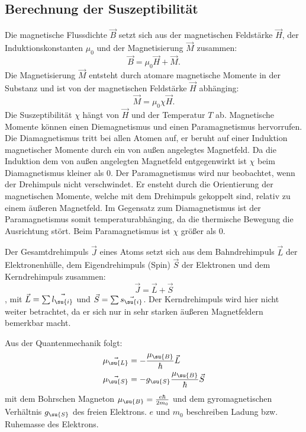 \subsection{Berechnung der Suszeptibilität}
Die magnetische Flussdichte $\vec{B}$ setzt sich aus der magnetischen Feldstärke
$\vec{H}$, der Induktionskonstanten $\mu_0$ und der Magnetisierung $\vec{M}$
zusammen:
\begin{equation}
  \vec{B} = \mu_0 \vec{H} + \vec{M}.
\end{equation}
Die Magnetisierung $\vec{M}$ entsteht durch atomare magnetische Momente in der
Substanz und ist von der magnetischen Feldstärke $\vec{H}$ abhänging:
\begin{equation}
  \vec{M} = \mu_0 \chi \vec{H}.
\end{equation}
Die Suszeptibilität $\chi$ hängt von $\vec{H}$ und der Temperatur $T$ ab.
Magnetische Momente können einen Diemagnetismus und einen Paramagnetismus
hervorrufen. Die Diamagnetismus tritt bei allen Atomen auf, er beruht auf einer
Induktion magnetischer Momente durch ein von außen angelegtes Magnetfeld.
Da die Induktion dem von außen angelegten Magnetfeld entgegenwirkt ist $\chi$
beim Diamagnetismus kleiner als 0. Der Paramagnetismus wird nur beobachtet, wenn
der Drehimpuls nicht verschwindet. Er ensteht durch die Orientierung der
magnetischen Momente, welche mit dem Drehimpuls gekoppelt sind, relativ zu einem
äußeren Magnetfeld. Im Gegensatz zum Diamagnetismus ist der Paramagnetismus somit
temperaturabhänging, da die thermische Bewegung die Ausrichtung stört. Beim
Paramagnetismus ist $\chi$ größer als 0.

Der Gesamtdrehimpuls $\vec{J}$ eines Atoms setzt sich aus dem Bahndrehimpuls $\vec{L}$
der Elektronenhülle, dem Eigendrehimpuls (Spin) $\vec{S}$ der Elektronen und dem
Kerndrehimpuls zusammen:
\begin{equation}
  \vec{J} = \vec{L} + \vec{S}
\end{equation}
, mit $\vec{L} = \sum \vec{l_\su{i}}$ und $\vec{S} = \sum \vec{s_\su{i}}$.
Der Kerndrehimpuls wird hier nicht weiter betrachtet,
da er sich nur in sehr starken äußeren Magnetfeldern bemerkbar macht.

Aus der Quantenmechanik folgt:
\begin{align}
  \vec{\mu_\su{L}} &= -\frac{\mu_\su{B}}{\hbar} \vec{L} \\
  \vec{\mu_\su{S}} &= -g_\su{S}\frac{\mu_\su{B}}{\hbar} \vec{S}
\end{align}
mit dem Bohrschen Magneton $\mu_\su{B} = \frac{e \hbar}{2m_0}$ und dem
gyromagnetischen Verhältnis $g_\su{S}$ des freien Elektrons. $e$ und $m_0$
beschreiben Ladung bzw. Ruhemasse des Elektrons.

